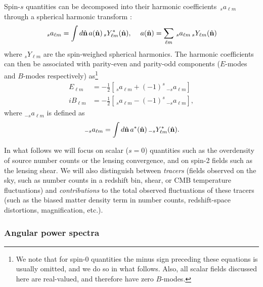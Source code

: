 \documentclass[\docopts]{\docclass}
\newcommand{\nv}{\hat{\bf n}}
\begin{document}
Spin-$s$ quantities can be decomposed into their harmonic coefficients $\,_sa_{\ell m}$ through a spherical harmonic transform \citep{1997PhRvD..55.1830Z,2011A&A...526A.108R}:
\begin{equation}\nonumber
  \,_sa_{\ell m}=\int d\nv\,a(\nv)\,_sY^*_{\ell m}(\nv),\hspace{12pt}
  a(\nv)=\sum_{\ell m}\,_sa_{\ell m}\,_sY_{\ell m}(\nv)
\end{equation}
where $_sY_{\ell m}$ are the spin-weighed spherical harmonics. The harmonic coefficients can then be associated with parity-even and parity-odd components ($E$-modes and $B$-modes respectively) as\footnote{We note that for spin-$0$ quantities the minus sign preceding these equations is usually omitted, and we do so in what follows. Also, all scalar fields discussed here are real-valued, and therefore have zero $B$-modes.}
\begin{align}\nonumber
   E_{\ell m}&=-\frac{1}{2}\left[\,_{s}a_{\ell m}+(-1)^s\,_{-s}a_{\ell m}\right]\\
  iB_{\ell m}&=-\frac{1}{2}\left[\,_{s}a_{\ell m}-(-1)^s\,_{-s}a_{\ell m}\right],
\end{align}
where $_{-s}a_{\ell m}$ is defined as
\begin{equation}\nonumber
  \,_{-s}a_{\ell m}=\int d\nv\,a^*(\nv)\,_{-s}Y^*_{\ell m}(\nv).
\end{equation}

In what follows we will focus on scalar ($s=0$) quantities such as the overdensity of source number counts or the lensing convergence, and on spin-2 fields such as the lensing shear. We will also distinguish between {\sl tracers} (fields observed on the sky, such as number counts in a redshift bin, shear, or CMB temperature fluctuations) and {\sl contributions} to the total observed fluctuations of these tracers (such as the biased matter density term in number counts, redshift-space distortions, magnification, etc.).

\subsubsection{Angular power spectra}\label{sssec:2pt.pspec}
\end{document}
